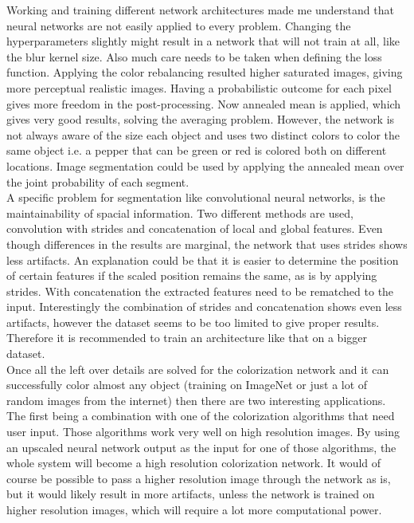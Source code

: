 \documentclass[a4paper]{article}
\begin{document}
\pagestyle{empty}


Working and training different network architectures made me understand that neural networks are not easily applied to every problem. Changing the hyperparameters slightly might result in a network that will not train at all, like the blur kernel size. Also much care needs to be taken when defining the loss function. Applying the color rebalancing resulted higher saturated images, giving more perceptual realistic images. Having a probabilistic outcome for each pixel gives more freedom in the post-processing. Now annealed mean is applied, which gives very good results, solving the averaging problem. However, the network is not always aware of the size each object and uses two distinct colors to color the same object i.e. a pepper that can be green or red is colored both on different locations. Image segmentation could be used by applying the annealed mean over the joint probability of each segment.\\

A specific problem for segmentation like convolutional neural networks, is the maintainability of spacial information. Two different methods are used, convolution with strides and concatenation of local and global features. Even though differences in the results are marginal, the network that uses strides shows less artifacts. An explanation could be that it is easier to determine the position of certain features if the scaled position remains the same, as is by applying strides. With concatenation the extracted features need to be rematched to the input. Interestingly the combination of strides and concatenation shows even less artifacts, however the dataset seems to be too limited to give proper results. Therefore it is recommended to train an architecture like that on a bigger dataset.  \\

Once all the left over details are solved for the colorization network and it can successfully color almost any object (training on ImageNet or just a lot of random images from the internet) then there are two interesting applications. The first being a combination with one of the colorization algorithms that need user input. Those algorithms work very well on high resolution images. By using an upscaled neural network output as the input for one of those algorithms, the whole system will become a high resolution colorization network. It would of course be possible to pass a higher resolution image through the network as is, but it would likely result in more artifacts, unless the network is trained on higher resolution images, which will require a lot more computational power.
\end{document}
